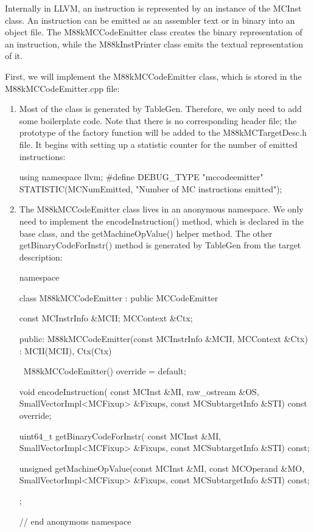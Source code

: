 Internally in LLVM, an instruction is represented by an instance of the MCInst class. An instruction can be emitted as an assembler text or in binary into an object file. The M88kMCCodeEmitter class creates the binary representation of an instruction, while the M88kInstPrinter class emits the textual representation of it.

First, we will implement the M88kMCCodeEmitter class, which is stored in the M88kMCCodeEmitter.cpp file:

\begin{enumerate}
\item
Most of the class is generated by TableGen. Therefore, we only need to add some boilerplate code. Note that there is no corresponding header file; the prototype of the factory function will be added to the M88kMCTargetDesc.h file. It begins with setting up a statistic counter for the number of emitted instructions:

\begin{cpp}
using namespace llvm;
#define DEBUG_TYPE "mccodeemitter"
STATISTIC(MCNumEmitted,
          "Number of MC instructions emitted");
\end{cpp}

\item
The M88kMCCodeEmitter class lives in an anonymous namespace. We only need to implement the encodeInstruction() method, which is declared in the base class, and the getMachineOpValue() helper method. The other getBinaryCodeForInstr() method is generated by TableGen from the target description:

\begin{cpp}
namespace {
class M88kMCCodeEmitter : public MCCodeEmitter {
    const MCInstrInfo &MCII;
    MCContext &Ctx;

public:
    M88kMCCodeEmitter(const MCInstrInfo &MCII,
                      MCContext &Ctx)
    : MCII(MCII), Ctx(Ctx) {}

    ~M88kMCCodeEmitter() override = default;

    void encodeInstruction(
        const MCInst &MI, raw_ostream &OS,
        SmallVectorImpl<MCFixup> &Fixups,
        const MCSubtargetInfo &STI) const override;

    uint64_t getBinaryCodeForInstr(
        const MCInst &MI,
        SmallVectorImpl<MCFixup> &Fixups,
        const MCSubtargetInfo &STI) const;

    unsigned
    getMachineOpValue(const MCInst &MI,
                        const MCOperand &MO,
                        SmallVectorImpl<MCFixup> &Fixups,
                        const MCSubtargetInfo &STI) const;
};
} // end anonymous namespace
\end{cpp}


\end{enumerate}
